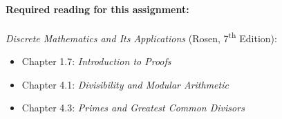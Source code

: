 






\crossline
\paragraph{Required reading for this assignment:}
\emph{Discrete Mathematics and Its Applications} (Rosen, 7\textsuperscript{th} Edition):
\begin{itemize}
\item Chapter 1.7: \emph{Introduction to Proofs}
\item Chapter 4.1: \emph{Divisibility and Modular Arithmetic}
\item Chapter 4.3:  \emph{Primes and Greatest Common Divisors}
\end{itemize}

\noteondifficultylevel

\def\hidesolution{}

\crossline


